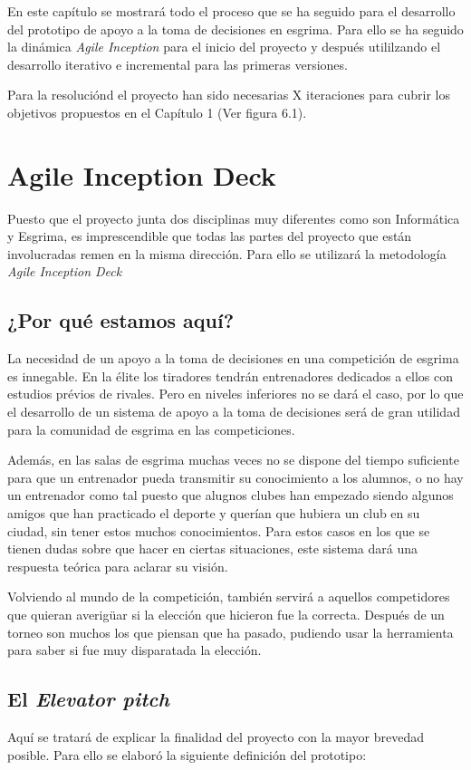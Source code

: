 En este capítulo se mostrará todo el proceso que se ha seguido para el desarrollo del prototipo
de apoyo a la toma de decisiones en esgrima. Para ello se ha seguido la dinámica \textit{Agile Inception}
para el inicio del proyecto y después utililzando el desarrollo iterativo e incremental para
las primeras versiones.

Para la resoluciónd el proyecto han sido necesarias X iteraciones para cubrir
los objetivos propuestos en el Capítulo 1 (Ver figura 6.1).

\section{Agile Inception Deck}

Puesto que el proyecto junta dos disciplinas muy diferentes como son Informática y Esgrima,
es imprescendible que todas las partes del proyecto que están involucradas remen en la misma
dirección. Para ello se utilizará la metodología \textit{Agile Inception Deck}

\subsection{¿Por qué estamos aquí?}
La necesidad de un apoyo a la toma de decisiones en una competición de esgrima es innegable.
En la élite los tiradores tendrán entrenadores dedicados a ellos con estudios prévios de rivales.
Pero en niveles inferiores no se dará el caso, por lo que el desarrollo de un sistema de
apoyo a la toma de decisiones será de gran utilidad para la comunidad de esgrima en las
competiciones.

Además, en las salas de esgrima muchas veces no se dispone del tiempo suficiente para que un
entrenador pueda transmitir su conocimiento a los alumnos, o no hay un entrenador como tal
puesto que alugnos clubes han empezado siendo algunos amigos que han practicado el deporte
y querían que hubiera un club en su ciudad, sin tener estos muchos conocimientos. Para estos
casos en los que se tienen dudas sobre que hacer en ciertas situaciones, este sistema
dará una respuesta teórica para aclarar su visión.

Volviendo al mundo de la competición, también servirá a aquellos competidores que quieran
averigüar si la elección que hicieron fue la correcta. Después de un torneo son muchos
los que piensan que ha pasado, pudiendo usar la herramienta para saber si fue muy
disparatada la elección.

\subsection{El \textit{Elevator pitch}}
Aquí se tratará de explicar la finalidad del proyecto con la mayor brevedad posible. Para ello
se elaboró la siguiente definición del prototipo:

